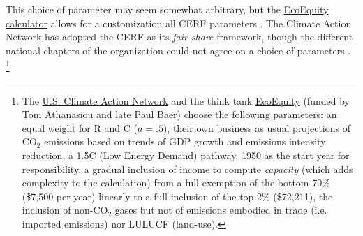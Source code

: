 This choice of parameter may seem somewhat arbitrary, but the \href{https://climateequityreference.org}{EcoEquity calculator} allows for a customization all CERF %
parameters \citep{holz_fairly_2018,holz_climate_2019}. The Climate Action Network has adopted the CERF %
as its \textit{fair share} framework, though the different national chapters of the organization could not agree on a choice of parameters \citep{athanasiou_fair_2022}.%
\footnote{The \href{https://usfairshare.org/}{U.S. Climate Action Network} and the think tank \href{https://www.ecoequity.org/about/}{EcoEquity} (funded by Tom Athanasiou and late Paul Baer) choose the following parameters: an equal weight for R and C ($a=.5$), their own \href{https://climateequityreference.org/calculator-information/gdp-and-emissions-baselines/}{business as usual projections} of CO$_\text{2}$ emissions based on trends of GDP growth and emissions intensity reduction,  %
a 1.5\textdegree{}C (Low Energy Demand) pathway, 1950 as the start year for responsibility, a gradual inclusion of income to compute \textit{capacity} (which adds complexity to the calculation) from a full exemption of the bottom 70\% (\$7,500 per year) linearly to a full inclusion of the top 2\% (\$72,211), the inclusion of non-CO$_\text{2}$ gases but not of emissions embodied in trade (i.e. imported emissions) nor LULUCF (land-use). }

